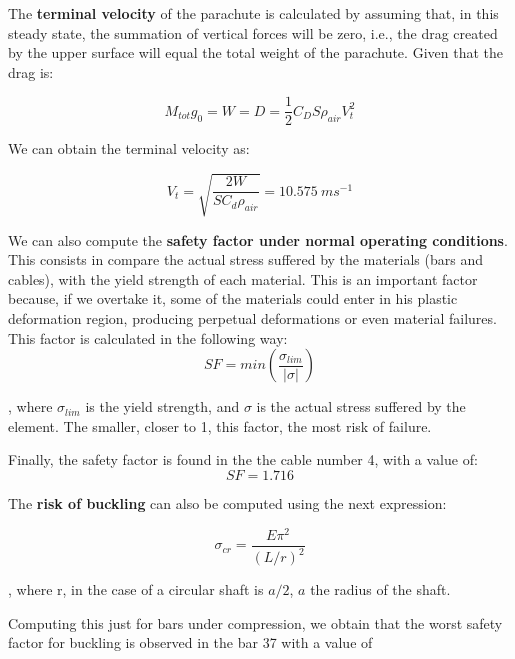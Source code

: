 The \textbf{terminal velocity} of the parachute is calculated by assuming that, in this
steady state, the summation of vertical forces will be zero, i.e., the drag
created by the upper surface will equal the total weight of the parachute. Given
that the drag is:

\begin{equation}
	M_{tot} g_0 = W = D = \frac{1}{2}C_D S \rho_{air} V_t^2
\end{equation}

We can obtain the terminal velocity as:

\begin{equation}
	\boxed{V_t = \sqrt{\frac{2W}{S C_d\rho_{air}}} = 10.575 ~ m s^{-1}}
\end{equation}

We can also compute the \textbf{safety factor under normal operating conditions}. This
consists in compare the actual stress suffered by the materials (bars and cables),
with the yield strength of each material. This is an important factor because, if
we overtake it, some of the materials could enter in his plastic deformation region,
producing perpetual deformations or even material failures.\\

This factor is calculated in the following way:
\begin{equation}
	SF = min\left(\frac{\sigma_{lim}}{|\sigma|}\right)
\end{equation}

, where $\sigma_{lim}$ is the yield strength, and $\sigma$ is the actual stress
suffered by the element. The smaller, closer to 1, this factor, the most risk of
failure.

Finally, the safety factor is found in the the cable number 4, with a value of:
\begin{equation}
	\boxed{SF = 1.716}
\end{equation}

The \textbf{risk of buckling} can also be computed using the next expression:

\begin{equation}
	\sigma_{cr} = \frac{E \pi^2}{(L/r)^2}
\end{equation}

, where r, in the case of a circular shaft is $a/2$, $a$ the radius of the shaft.

Computing this just for bars under compression, we obtain that the worst safety factor
for buckling is observed in the bar 37 with a value of

